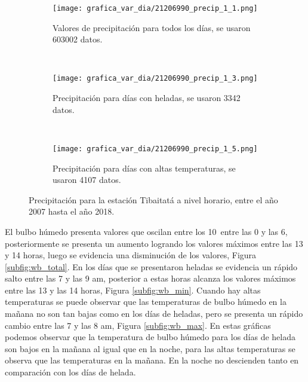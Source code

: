 \begin{figure}[H]
    \centering
    \begin{subfigure}[b]{0.45\textwidth}
    \caption{Valores de precipitación para todos los días, se usaron 603002 datos.}
	\texttt{[image: grafica\_var\_dia/21206990\_precip\_1\_1.png]}
    \label{subfig:prec_total}
	\end{subfigure}
	~
    \begin{subfigure}[b]{0.45\textwidth}
    \caption{Precipitación para días con heladas, se usaron 3342 datos.}
	\texttt{[image: grafica\_var\_dia/21206990\_precip\_1\_3.png]}
    \label{subfig:prec_min}
	\end{subfigure}
		~
    \begin{subfigure}[b]{0.45\textwidth}
    \caption{Precipitación para días con altas temperaturas, se usaron 4107 datos.}
	\texttt{[image: grafica\_var\_dia/21206990\_precip\_1\_5.png]}
    \label{subfig:prec_max}
	\end{subfigure}
	
    \caption{Precipitación para la estación Tibaitatá a nivel horario, entre el año 2007 hasta el año 2018.}
\end{figure}




El bulbo húmedo presenta valores que oscilan entre los 10\celsius\ entre las 0 y las 6, posteriormente se presenta un aumento logrando los valores máximos entre las 13 y 14 horas, luego se evidencia una disminución de los valores, Figura \ref{subfig:wb_total}. En los días que se presentaron heladas se evidencia un rápido salto entre las 7 y las 9 am, posterior a estas horas alcanza los valores máximos entre las 13 y las 14 horas, Figura \ref{subfig:wb_min}. Cuando hay altas temperaturas se puede observar que las temperaturas de bulbo húmedo en la mañana no son tan bajas como en los días de heladas, pero se presenta un rápido cambio entre las 7 y las 8 am, Figura \ref{subfig:wb_max}. En estas gráficas podemos observar que la temperatura de bulbo húmedo para los días de helada son bajos en la mañana al igual que en la noche, para las altas temperaturas se observa que las temperaturas en la mañana. En la noche no descienden tanto en comparación con los días de helada.

